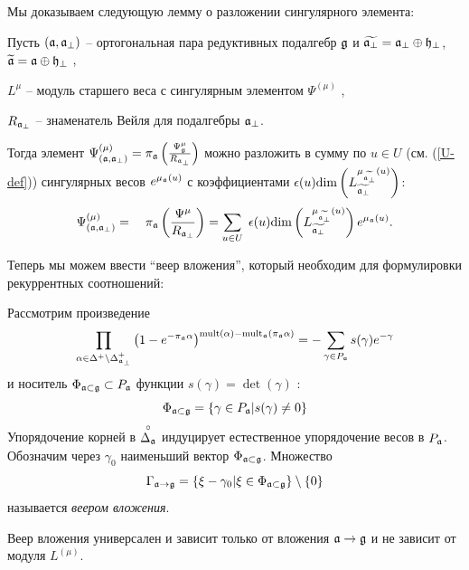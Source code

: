 \documentclass[14pt,autoref,href,facsimile
]{disser}
\begin{document}
Мы доказываем следующую лемму о разложении сингулярного элемента:
\begin{lemma}
\label{lemma}
Пусть $\left( \mathfrak{a},\mathfrak{a}_{\perp} \right)$ -- ортогональная пара редуктивных подалгебр $\mathfrak{g}$ и  $\widetilde{\mathfrak{a}_{\perp}}=\mathfrak{a}_{\perp}\oplus \mathfrak{h}_{\perp }$, $\widetilde{\mathfrak{a}}=\mathfrak{a}\oplus\mathfrak{h}_{\perp }$ ,

$L^{\mu }$ -- модуль старшего веса с сингулярным элементом $\Psi ^{\left(\mu \right)}$ ,

$R_{\mathfrak{a}_{\perp }}$ -- знаменатель Вейля для подалгебры $\mathfrak{a}_{\perp }$.

Тогда элемент  $\Psi ^{\left( \mu \right) }_{\left(  \mathfrak{a}, \mathfrak{a}_{\perp} \right)}=\pi _{\mathfrak{a}}\left( \frac{\Psi _{\mathfrak{g}}^{\mu }}{R_{\mathfrak{a}_{\perp }}}\right) $ можно разложить в сумму по  $u\in U$ (см. (\ref{U-def})) сингулярных весов $e^{\mu _{\mathfrak{a}}\left( u\right) }$ с коэффициентами $\epsilon (u)\mathrm{\dim}\left( L_{\widetilde{\mathfrak{a}_{\perp}}}^{\mu _{\widetilde{\mathfrak{a}_{\perp}}}\left( u\right) }\right) $:
\begin{equation}
\Psi ^{\left( \mu \right) }_{\left(  \af, \afb \right)}=\quad \pi _{\af}\left( \frac{\Psi^{\mu }}{R_{\af%
_{\perp }}}\right) =\sum_{u\in U}\;\epsilon (u)\mathrm{\dim }
\left( L_{\widetilde{\af_{\perp }}}^{\mu _{%
\widetilde{\af_{\perp }}}\left( u\right) }\right) e^{\mu _{\af}\left( u \right) }.
\end{equation}
\end{lemma}

Теперь мы можем ввести ``веер вложения'', который необходим для формулировки рекуррентных соотношений:
\begin{definition}
\label{fan-definition} Рассмотрим произведение
\begin{equation}
\prod_{\alpha \in \Delta ^{+}\setminus \Delta _{\afb }^{+}}\left( 1-e^{-\pi
_{\af}\alpha }\right) ^{\mathrm{mult}(\alpha )-\mathrm{mult}_{\af%
}(\pi _{\af}\alpha )}=-\sum_{\gamma \in P_{\af}}s(\gamma
)e^{-\gamma }  \label{eq:142}
\end{equation}
и носитель $\Phi _{\mathfrak{a}\subset \mathfrak{g}}\subset P_{\mathfrak{a}}$ функции $s(\gamma )=\det \left( \gamma \right) $ :
\begin{equation}
\Phi _{\mathfrak{a}\subset \mathfrak{g}}=\left\{ \gamma \in P_{\mathfrak{a}}|s(\gamma
)\neq 0\right\}   \label{eq:37}
\end{equation}
Упорядочение корней в  $\stackrel{\circ }{\Delta _{\mathfrak{a}}}$ индуцирует естественное упорядочение весов в $P_{\mathfrak{a}}$. Обозначим через $\gamma_{0}$ наименьший вектор $\Phi _{\mathfrak{a}\subset \mathfrak{g}}$. Множество
\begin{equation}
\Gamma _{\af\rightarrow \gf}=\left\{ \xi -\gamma _{0}|\xi \in \Phi _{%
\af\subset \gf}\right\} \setminus \left\{ 0\right\}
\label{fan-defined}
\end{equation}
называется  \textit{веером вложения}.
\end{definition}
Веер вложения универсален и зависит только от вложения $\mathfrak{a}\to\mathfrak{g}$ и не зависит от модуля $L^{(\mu)}$.
\end{document}
